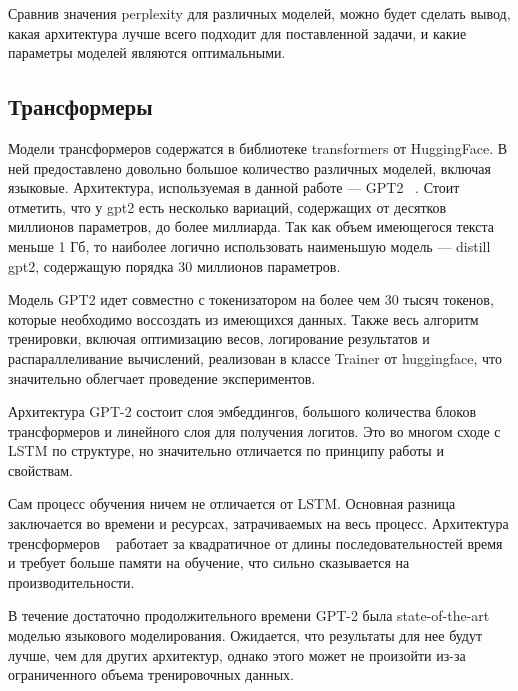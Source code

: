 Сравнив значения perplexity для различных моделей, можно будет сделать вывод, какая архитектура лучше всего подходит для поставленной задачи, и какие параметры моделей являются оптимальными.

\subsection{Трансформеры}

Модели трансформеров содержатся в библиотеке transformers от HuggingFace. В ней предоставлено довольно большое количество различных моделей, включая языковые. Архитектура, используемая в данной работе --- GPT2 ~\cite{gpt2}. Стоит отметить, что у gpt2 есть несколько вариаций, содержащих от десятков миллионов параметров, до более миллиарда. Так как объем имеющегося текста меньше 1 Гб, то наиболее логично использовать наименьшую модель --- distill gpt2, содержащую порядка 30 миллионов параметров.

Модель GPT2 идет совместно с токенизатором на более чем 30 тысяч токенов, которые необходимо воссоздать из имеющихся данных. Также весь алгоритм тренировки, включая оптимизацию весов, логирование результатов и распараллеливание вычислений, реализован в классе Trainer от huggingface, что значительно облегчает проведение экспериментов.

Архитектура GPT-2 состоит слоя эмбеддингов, большого количества блоков трансформеров и линейного слоя для получения логитов. Это во многом сходе с LSTM по структуре, но значительно отличается по принципу работы и свойствам.

Сам процесс обучения ничем не отличается от LSTM. Основная разница заключается во времени и ресурсах, затрачиваемых на весь процесс. Архитектура тренсформеров ~\cite{attention-is-all-you-need} работает за квадратичное от длины последовательностей время и требует больше памяти на обучение, что сильно сказывается на производительности.

В течение достаточно продолжительного времени GPT-2 была state-of-the-art моделью языкового моделирования. Ожидается, что результаты для нее будут лучше, чем для других архитектур, однако этого может не произойти из-за ограниченного объема тренировочных данных.

